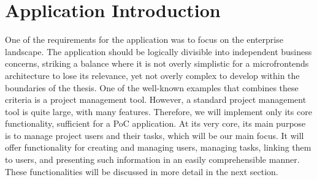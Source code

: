 \section{Application Introduction}
One of the requirements for the application was to focus on the enterprise landscape. The application should be logically divisible into independent business concerns, striking a balance where it is not overly simplistic for a microfrontends architecture to lose its relevance, yet not overly complex to develop within the boundaries of the thesis. One of the well-known examples that combines these criteria is a project management tool. However, a standard project management tool is quite large, with many features. Therefore, we will implement only its core functionality, sufficient for a PoC application. At its very core, its main purpose is to manage project users and their tasks, which will be our main focus. It will offer functionality for creating and managing users, managing tasks, linking them to users, and presenting such information in an easily comprehensible manner. These functionalities will be discussed in more detail in the next section.